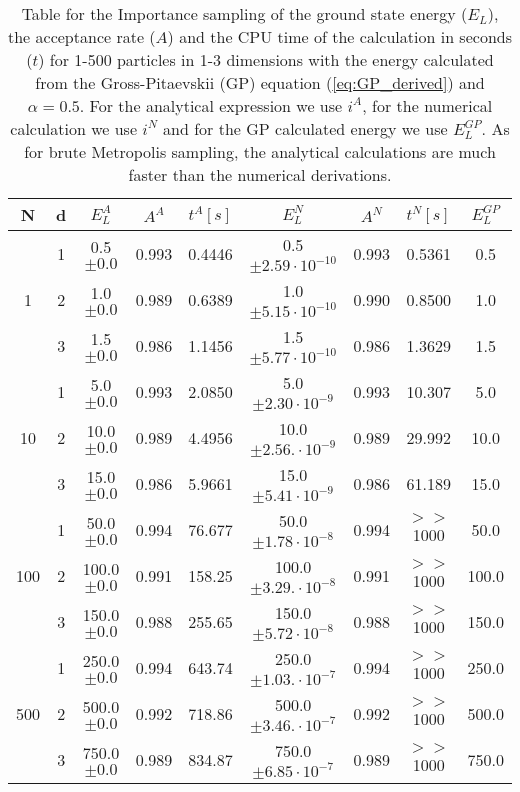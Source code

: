 \documentclass[12pt,a4paper,english]{article}
\begin{document}
\begin{table}[htbp!]
	\centering
	\begin{tabular}{ |c|c|c|c|c|c|c|c|c| }
		\hline \rule{0pt}{13pt}
		N & d & $E_L^A$ & $A^A$ & $t^A[s]$ & $E_L^N$ & $A^N$ & $t^N[s]$ & $E_L^{GP}$ \\
		\hline \rule{0pt}{13pt}
		& 1 & 0.5$\pm0.0$ & 0.993 & 0.4446 & 0.5$\pm2.59\cdot10^{-10}$ & 0.993 & 0.5361 & 0.5\\
		1 & 2 & 1.0$\pm0.0$ & 0.989 & 0.6389 & 1.0$\pm5.15\cdot10^{-10}$ & 0.990 & 0.8500 & 1.0\\
		& 3 & 1.5$\pm0.0$ & 0.986 & 1.1456 & 1.5$\pm5.77\cdot10^{-10}$ & 0.986 & 1.3629 & 1.5\\
		\hline \rule{0pt}{13pt}
		& 1 & 5.0$\pm0.0$ & 0.993 & 2.0850 & 5.0$\pm2.30\cdot10^{-9}$ & 0.993 & 10.307 & 5.0\\
		10 & 2 & 10.0$\pm0.0$ & 0.989 & 4.4956 & 10.0$\pm2.56.\cdot10^{-9}$ & 0.989 & 29.992 & 10.0\\
		& 3 & 15.0$\pm0.0$ & 0.986 & 5.9661 & 15.0$\pm5.41\cdot10^{-9}$ & 0.986 & 61.189 & 15.0\\
		\hline \rule{0pt}{13pt}
		& 1 & 50.0$\pm0.0$ & 0.994 & 76.677 & 50.0$\pm1.78\cdot10^{-8}$ & 0.994 & $>>$1000 & 50.0\\
		100 & 2 & 100.0$\pm0.0$ & 0.991 & 158.25 & 100.0$\pm 3.29.\cdot10^{-8}$ & 0.991 & $>>$1000 & 100.0\\
		& 3 & 150.0$\pm0.0$ & 0.988 & 255.65 & 150.0$\pm5.72\cdot10^{-8}$ & 0.988 & $>>$1000 & 150.0\\
		\hline \rule{0pt}{13pt}
		& 1 & 250.0$\pm0.0$ & 0.994 & 643.74 & 250.0$\pm1.03.\cdot10^{-7}$ & 0.994 & $>>$1000 & 250.0\\
		500 & 2 & 500.0$\pm0.0$ & 0.992 & 718.86 & 500.0$\pm3.46.\cdot10^{-7}$ & 0.992 & $>>$1000 & 500.0\\
		& 3 & 750.0$\pm0.0$ & 0.989 & 834.87 & 750.0$\pm6.85\cdot10^{-7}$ & 0.989 & $>>$1000 & 750.0\\
		\hline
	\end{tabular}	
	\caption{Table for the Importance sampling of the ground state energy ($E_L$), the acceptance rate ($A$) and the CPU time of the calculation in seconds ($t$) for 1-500 particles in 1-3 dimensions with the energy calculated from the Gross-Pitaevskii (GP) equation (\ref{eq:GP_derived}) and $\alpha=0.5$. For the analytical expression we use $i^A$, for the numerical calculation we use $i^N$ and for the GP calculated energy we use $E_L^{GP}$. As for brute Metropolis sampling, the analytical calculations are much faster than the numerical derivations. \label{tab:imp_analytic_vs_numeric}}
\end{table}
\end{document}
